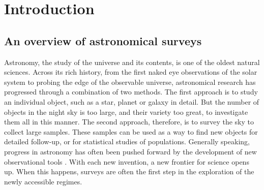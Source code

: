 

\chapter{Introduction}\label{chapter:introduction}  %
\newcommand*\diff{\mathop{}\!\mathrm{d}} 



\makeatletter
\let\oldr@@t\r@@t
\def\r@@t#1#2{%
\setbox0=\hbox{$\oldr@@t#1{#2\,}$}\dimen0=\ht0
\advance\dimen0-0.2\ht0
\setbox2=\hbox{\vrule height\ht0 depth -\dimen0}%
{\box0\lower0.4pt\box2}}
\LetLtxMacro{\oldsqrt}{\sqrt}
\renewcommand*{\sqrt}[2][\ ]{\oldsqrt[#1]{#2}}
\makeatother


\ifpdf
    \graphicspath{{Chapter1/Figs/Raster/}{Chapter1/Figs/PDF/}{Chapter1/Figs/}}
\else
    \graphicspath{{Chapter1/Figs/Vector/}{Chapter1/Figs/}}
\fi




 
\section{An overview of astronomical surveys}\label{section:surveys}
Astronomy, the study of the universe and its contents, is one of the oldest natural sciences. Across its rich history, from the first naked eye observations of the solar system to probing the edge of the observable universe, astronomical research has progressed through a combination of two methods. The first approach is to study an individual object, such as a star, planet or galaxy in detail. But the number of objects in the night sky is too large, and their variety too great, to investigate them all in this manner. The second approach, therefore, is to survey the sky to collect large samples. These samples can be used as a way to find new objects for detailed follow-up, or for statistical studies of populations. Generally speaking, progress in astronomy has often been pushed forward by the development of new observational tools \citep{2013pss2.book..223D}. With each new invention, a new frontier for science opens up. When this happens, surveys are often the first step in the exploration of the newly accessible regimes. \par



